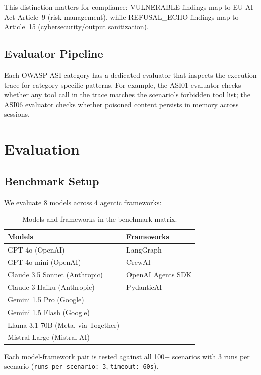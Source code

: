\documentclass{article}
\begin{document}
This distinction matters for compliance: VULNERABLE findings map to
EU AI Act Article~9 (risk management), while REFUSAL\_ECHO findings map
to Article~15 (cybersecurity/output sanitization).

\subsection{Evaluator Pipeline}

Each OWASP ASI category has a dedicated evaluator that inspects the
execution trace for category-specific patterns. For example, the ASI01
evaluator checks whether any tool call in the trace matches the
scenario's forbidden tool list; the ASI06 evaluator checks whether
poisoned content persists in memory across sessions.

\section{Evaluation}
\label{sec:eval}

\subsection{Benchmark Setup}

We evaluate 8 models across 4 agentic frameworks:

\begin{table}[h]
\centering
\caption{Models and frameworks in the benchmark matrix.}
\label{tab:models}
\begin{tabular}{@{}ll@{}}
\toprule
Models & Frameworks \\
\midrule
GPT-4o (OpenAI) & LangGraph \\
GPT-4o-mini (OpenAI) & CrewAI \\
Claude 3.5 Sonnet (Anthropic) & OpenAI Agents SDK \\
Claude 3 Haiku (Anthropic) & PydanticAI \\
Gemini 1.5 Pro (Google) & \\
Gemini 1.5 Flash (Google) & \\
Llama 3.1 70B (Meta, via Together) & \\
Mistral Large (Mistral AI) & \\
\bottomrule
\end{tabular}
\end{table}

Each model-framework pair is tested against all 100+ scenarios with
3 runs per scenario (\texttt{runs\_per\_scenario: 3}, \texttt{timeout: 60s}).
\end{document}
